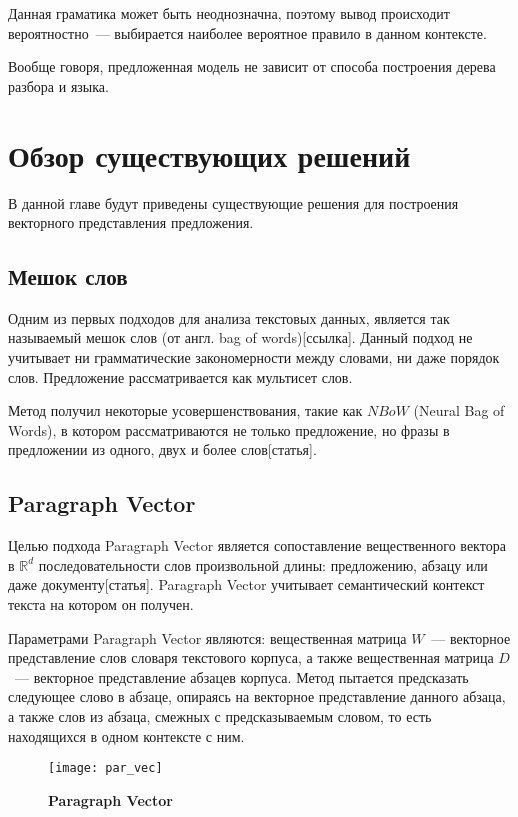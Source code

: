Данная граматика может быть неоднозначна, 
поэтому вывод происходит вероятностно~--- выбирается наиболее вероятное правило в данном контексте.

Вообще говоря, предложенная модель не зависит от способа построения дерева разбора и языка.

\section{Обзор существующих решений}

В данной главе будут приведены существующие решения для построения векторного представления предложения.

\subsection{Мешок слов}
Одним из первых подходов для анализа текстовых данных, 
является так называемый мешок слов (от англ. bag of words)[ссылка].
Данный подход не учитывает ни грамматические закономерности между словами, ни даже порядок слов.
Предложение рассматривается как мультисет слов.

Метод получил некоторые усовершенствования, такие как $NBoW$ (Neural Bag of Words), 
в котором рассматриваются не только предложение, но фразы в предложении из одного, двух и более слов[статья].

\subsection{Paragraph Vector}
Целью подхода Paragraph Vector является сопоставление вещественного вектора в $\mathbb{R}^d$ последовательности слов произвольной длины: предложению, абзацу или даже документу[статья].
Paragraph Vector учитывает семантический контекст текста на котором он получен.

Параметрами Paragraph Vector являются: вещественная матрица $W$~--- векторное представление слов словаря текстового корпуса, а также вещественная матрица $D$~--- векторное представление абзацев корпуса. Метод пытается предсказать следующее слово в абзаце, опираясь на векторное представление данного абзаца, а также слов из абзаца, смежных с предсказываемым словом, то есть находящихся в одном контексте с ним.

\begin{figure}[h]
\texttt{[image: par\_vec]}
\caption{\textbf{Paragraph Vector}}
\label{fig:par_vec}
\end{figure}

